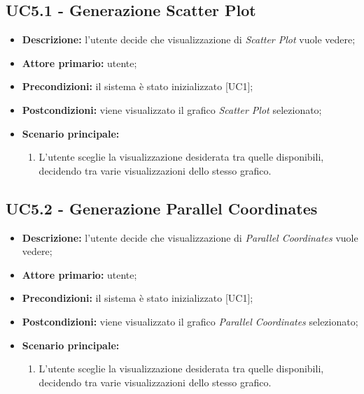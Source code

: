 \subsection{UC5.1 - Generazione Scatter Plot}
\begin{itemize}
    \item \textbf{Descrizione:} l'utente decide che visualizzazione di \textit{Scatter Plot} vuole vedere;
    \item \textbf{Attore primario:} utente;
    \item \textbf{Precondizioni:} il sistema è stato inizializzato [UC1];
    \item \textbf{Postcondizioni:} viene visualizzato il grafico \textit{Scatter Plot} selezionato;
    \item \textbf{Scenario principale:}
    \begin{enumerate}
      \item L'utente sceglie la visualizzazione desiderata tra quelle disponibili, decidendo tra varie visualizzazioni dello stesso grafico.
    \end{enumerate}
\end{itemize}

\subsection{UC5.2 - Generazione Parallel Coordinates}
\begin{itemize}
    \item \textbf{Descrizione:} l'utente decide che visualizzazione di \textit{Parallel Coordinates} vuole vedere;
    \item \textbf{Attore primario:} utente;
    \item \textbf{Precondizioni:} il sistema è stato inizializzato [UC1];
    \item \textbf{Postcondizioni:} viene visualizzato il grafico \textit{Parallel Coordinates} selezionato;
    \item \textbf{Scenario principale:}
    \begin{enumerate}
    \item L'utente sceglie la visualizzazione desiderata tra quelle disponibili, decidendo tra varie visualizzazioni dello stesso grafico.
    \end{enumerate}
\end{itemize}

